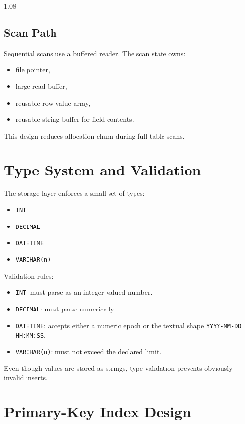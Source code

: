 \documentclass[11pt,a4paper]{article}
\begin{document}
\begin{spacing}{1.08}
\subsection{Scan Path}

Sequential scans use a buffered reader. The scan state owns:

\begin{itemize}
    \item file pointer,
    \item large read buffer,
    \item reusable row value array,
    \item reusable string buffer for field contents.
\end{itemize}

This design reduces allocation churn during full-table scans.

\section{Type System and Validation}

The storage layer enforces a small set of types:

\begin{itemize}
    \item \texttt{INT}
    \item \texttt{DECIMAL}
    \item \texttt{DATETIME}
    \item \texttt{VARCHAR(n)}
\end{itemize}

Validation rules:

\begin{itemize}
    \item \texttt{INT}: must parse as an integer-valued number.
    \item \texttt{DECIMAL}: must parse numerically.
    \item \texttt{DATETIME}: accepts either a numeric epoch or the textual shape \texttt{YYYY-MM-DD HH:MM:SS}.
    \item \texttt{VARCHAR(n)}: must not exceed the declared limit.
\end{itemize}

Even though values are stored as strings, type validation prevents obviously invalid inserts.

\section{Primary-Key Index Design}


\end{spacing}
\end{document}
